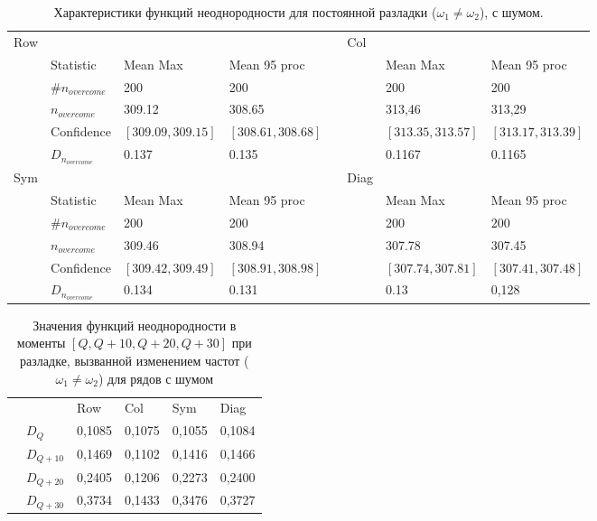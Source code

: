 \documentclass[specialist, substylefile = spbu.rtx,
			   subf, href, 12pt]{disser}
\begin{document}
\newpage
\begin{table}[!hhh]
	\center
	\small
	\caption{Характеристики функций неоднородности для постоянной разладки ($\omega_1 \neq \omega_2$), с шумом.}
	\begin{tabular}{llllllll}
		Row & 				   & 		  	  & 			 && Col & 		      & 			      \\
		& Statistic        & Mean Max 	  & Mean 95 proc && 	& Mean Max     & Mean 95 proc     \\
		& $\#n_{overcome}$ & 200 	  	  & 200 		 &&     & 200 	      & 200 			  \\
		& $n_{overcome}$   & 309.12   	  & 308.65      &&     & 313,46       & 313,29 		  \\
		& Confidence       & $[309.09, 309.15]$& $[308.61, 308.68]$&&     & $[313.35, 313.57]$ & $[313.17, 313.39]$     \\
		&$D_{n_{overcome}}$& 0.137		  &	0.135		 &&     & 0.1167			  &   0.1165                \\
		Sym & 				   & 		  	  & 			 && Diag& 		      & 			      \\
		& Statistic        & Mean Max 	  & Mean 95 proc && 	& Mean Max     & Mean 95 proc     \\
		& $\#n_{overcome}$ & 200 	  	  & 200 		 &&     & 200 	      & 200 			  \\
		& $n_{overcome}$   & 309.46   	  & 308.94      &&     & 307.78      & 307.45 		  \\
		& Confidence       & $[309.42, 309.49]$ & $[308.91, 308.98]$ &&     & $[307.74, 307.81]$ & $[307.41, 307.48]$     \\
		&$D_{n_{overcome}}$& 0.134		  &	0.131		 &&     & 0.13		 &0,128                   \\
	\end{tabular}
	\label{tab:PermanentNoisedHeterogeneity}
\end{table}

\begin{table}[!hhh]
	\center
	\caption{Значения функций неоднородности в моменты $[Q, Q+10, Q+20, Q+30]$ при разладке, вызванной изменением частот ($\omega_1 \neq \omega_2$) для рядов с шумом}
	\begin{tabular}{llllll}
		&              & Row 	  & Col 	& Sym    & Diag  \\
		& $D_Q$        & 0,1085	  & 0,1075 	& 0,1055 & 0,1084		\\
		& $D_{Q+10}$   & 0,1469   & 0,1102  & 0,1416 & 0,1466	\\
		& $D_{Q+20}$   & 0,2405   & 0,1206  & 0,2273 & 0,2400	\\
		& $D_{Q+30}$   & 0,3734	  &	0,1433	& 0,3476 & 0,3727	
	\end{tabular}
	\label{tab:PermanentNoisedHeterogeneityValues}
\end{table}
\end{document}
